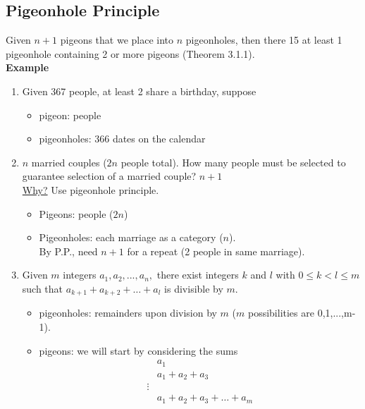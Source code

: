 \documentclass[12pt]{article}
\begin{document}
\setcounter{section}{3}


\subsection{Pigeonhole Principle}
Given $n+1$ pigeons that we place into $n$ pigeonholes, then there 15 at least 1 pigeonhole containing 2 or more pigeons (Theorem 3.1.1).\\

{\bf Example} 
\begin{enumerate}
    \item Given 367 people, at least 2 share a birthday, suppose
    \begin{itemize}
        \item pigeon: people
        \item pigeonholes: 366 dates on the calendar
    \end{itemize}
    
    \item $n$ married couples ($2n$ people total). How many people must be selected to guarantee selection of a married couple? $n+1$\\
    
    \underline{Why?} Use pigeonhole principle.
    \begin{itemize}
        \item Pigeons: people ($2n$)
        \item Pigeonholes: each marriage as a category ($n$).\\
        By P.P., need $n+1$ for a repeat (2 people in same marriage).
    \end{itemize}
    
    \item Given $m$ integers $a_1,a_2,...,a_n,$ there exist integers $k$ and $l$ with $0\le k< l \le m$ such that $a_{k+1}+a_{k+2}+\ldots+a_l$ is divisible by $m$.
    \begin{itemize}
        \item pigeonholes: remainders upon division by $m$ ($m$ possibilities are 0,1,...,m-1).
        \item pigeons: we will start by considering the sums\\
        \begin{align}
            &a_1\nonumber \\
            &a_1+a_2+a_3\nonumber \\
            \vdots \nonumber \\
            &a_1+a_2+a_3+\ldots +a_m \nonumber
        \end{align}
    \end{itemize}
    

\end{enumerate}
\end{document}
